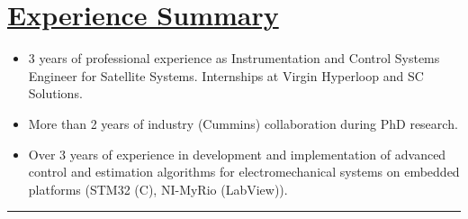 \section*{\underline{Experience Summary}}
\begin{itemize}
        \item 3 years of professional experience as Instrumentation and Control Systems Engineer for Satellite Systems. Internships at Virgin Hyperloop and SC Solutions.
        \item More than 2 years of industry (Cummins) collaboration during PhD research.
        \item Over 3 years of experience in development and implementation  of advanced control and estimation algorithms for electromechanical systems on embedded platforms (STM32 (C), NI-MyRio (LabView)).
\end{itemize}

\noindent\rule{\textwidth}{0.4pt}
